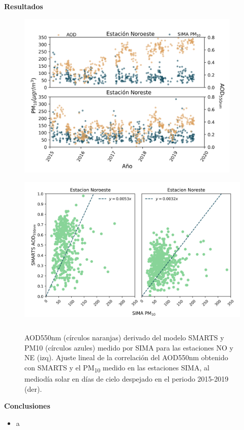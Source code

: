 \documentclass{article}
\begin{document}
\begin{center}
\begin{shaded}
\textbf{\textcolor{ver}{Resultados}}
\end{shaded}
\end{center}
\vspace{-0.8cm}
\begin{center}
    \begin{figure}[H]
        \centering
        \includegraphics[height=8cm]{images/AODsandPM10.png}
        \includegraphics[height=7.7cm]{images/AODvsPM10.png}
        \caption{AOD550nm (círculos naranjas) derivado del modelo SMARTS y PM10 (círculos azules) 
        medido por SIMA para las estaciones NO y NE (izq). Ajuste lineal de la correlación del AOD550nm obtenido con SMARTS
        y el PM\textsubscript{10} medido en las estaciones SIMA, al mediodía solar en días de cielo despejado en el periodo 2015-2019 (der).}
    \end{figure}
\end{center}
\begin{minipage}{0.60\linewidth}
\begin{center}
\begin{shaded}
\textbf{\textcolor{ver}{Conclusiones}}
\end{shaded}
\end{center}
\begin{itemize}
    \item a
\end{itemize}
\end{minipage}
\end{document}

